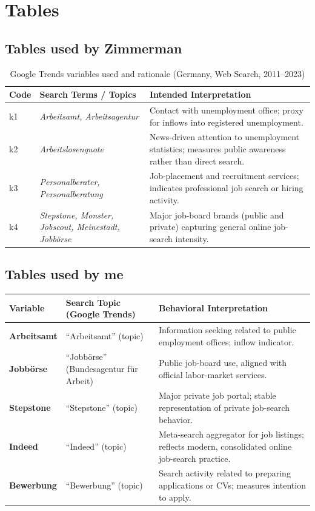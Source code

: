 \documentclass[12pt,a4paper]{article}
\begin{document}
\newpage
\section{Tables}
\subsection{Tables used by Zimmerman}


\begin{table}[H]
\centering
\caption{Google Trends variables used and rationale (Germany, Web Search, 2011--2023)}
\label{tab:variables}
\begin{tabular}{p{2cm} p{5cm} p{7cm}}
\toprule
\textbf{Code} & \textbf{Search Terms / Topics} & \textbf{Intended Interpretation} \\
\midrule
k1 & \emph{Arbeitsamt, Arbeitsagentur} & Contact with unemployment office; proxy for inflows into registered unemployment. \\[2mm]
k2 & \emph{Arbeitslosenquote} & News-driven attention to unemployment statistics; measures public awareness rather than direct search. \\[2mm]
k3 & \emph{Personalberater, Personalberatung} & Job-placement and recruitment services; indicates professional job search or hiring activity. \\[2mm]
k4 & \emph{Stepstone, Monster, Jobscout, Meinestadt, Jobbörse} & Major job-board brands (public and private) capturing general online job-search intensity. \\
\bottomrule
\end{tabular}
\end{table}

\subsection{Tables used by me}
\begin{table}[H]
\centering
\begin{tabular}{p{3cm} p{4cm} p{7cm}}
\toprule
\textbf{Variable} & \textbf{Search Topic (Google Trends)} & \textbf{Behavioral Interpretation} \\
\midrule
\textbf{Arbeitsamt} & “Arbeitsamt” (topic) & Information seeking related to public employment offices; inflow indicator. \\[2mm]
\textbf{Jobbörse} & “Jobbörse” (Bundesagentur für Arbeit) & Public job-board use, aligned with official labor-market services. \\[2mm]
\textbf{Stepstone} & “Stepstone” (topic) & Major private job portal; stable representation of private job-search behavior. \\[2mm]
\textbf{Indeed} & “Indeed” (topic) & Meta-search aggregator for job listings; reflects modern, consolidated online job-search practice. \\[2mm]
\textbf{Bewerbung} & “Bewerbung” (topic) & Search activity related to preparing applications or CVs; measures intention to apply. \\
\bottomrule
\end{tabular}
\end{table}
\end{document}
